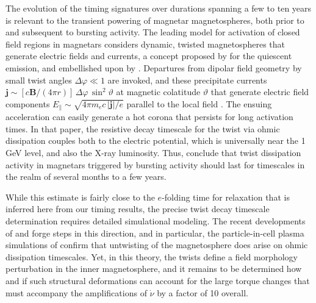 \documentclass[twocolumn]{aastex6}
\begin{document}
The evolution of the timing signatures over durations spanning a few 
to ten years is relevant to the transient powering of magnetar
magnetospheres, both prior to and subsequent to bursting activity.
The leading model for activation of closed field regions in magnetars
considers dynamic, twisted magnetospheres that generate electric fields
and currents, a concept proposed by \citet{thompson02ApJ:magnetars}
for the quiescent emission, and embellished upon by \citet{
  beloborodov07ApJ:magCorona}.  Departures from dipolar field geometry
by small twist angles $\Delta \varphi\ll 1$ are invoked, and these
precipitate currents $\mathbf{j} \sim [c \boldsymbol{B}/(4 \pi r)]
\, \Delta \varphi \, \sin^2 \vartheta $ at magnetic colatitude
$\vartheta$ that generate electric field components $E_{\parallel}
\sim \sqrt{ 4\pi m_ec \,\vert \mathbf{j}\vert / e} $ parallel to the
local field \citep[see][for details]{beloborodov07ApJ:magCorona}.  The
ensuing acceleration can easily generate a hot corona that persists
for long activation times. In that paper, the resistive decay timescale
for the twist via ohmic dissipation couples both to the electric potential,
which is universally near the 1 GeV level, and also the X-ray
luminosity.  Thus, \citet{beloborodov07ApJ:magCorona} conclude that
twist dissipation activity in magnetars triggered by bursting activity
should last for timescales in the realm of several months to a few
years.

While this estimate is fairly close to the $e$-folding time for relaxation
that is inferred here from our timing results, the precise twist decay
timescale determination requires detailed simulational modeling.  The
recent developments of \citet{parfrey13ApJ} and \citet{chen17:mag}
forge steps in this direction, and in particular, the particle-in-cell
plasma simulations of \citet{chen17:mag} confirm that untwisting of
the magnetosphere does arise on ohmic dissipation timescales. Yet, in
this theory, the twists define a field morphology perturbation in the
inner magnetosphere, and it remains to be determined how and if such
structural deformations can account for the large torque changes that
must accompany the amplifications of ${\dot \nu}$ by a factor of 10
overall.
\end{document}
